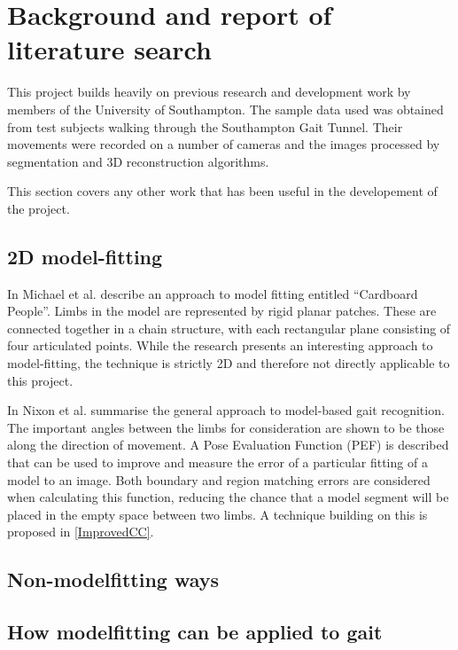 \section{Background and report of literature search}

This project builds heavily on previous research and development work by members of the University of Southampton.
The sample data used was obtained from test subjects walking through the Southampton Gait Tunnel.
Their movements were recorded on a number of cameras and the images processed by segmentation and 3D reconstruction algorithms.

This section covers any other work that has been useful in the developement of the project.

\subsection{2D model-fitting}

In \cite{cardboardpeople} Michael et al. describe an approach to model fitting entitled ``Cardboard People''.
Limbs in the model are represented by rigid planar patches.
These are connected together in a chain structure, with each rectangular plane consisting of four articulated points.
While the research presents an interesting approach to model-fitting, the technique is strictly 2D and therefore not directly applicable to this project.

In \cite{GaitBook} Nixon et al. summarise the general approach to model-based gait recognition.
The important angles between the limbs for consideration are shown to be those along the direction of movement.
A Pose Evaluation Function (PEF) is described that can be used to improve and measure the error of a particular fitting of a model to an image.
Both boundary and region matching errors are considered when calculating this function, reducing the chance that a model segment will be placed in the empty space between two limbs.
A technique building on this is proposed in \ref{ImprovedCC}.

\subsection{Non-modelfitting ways}

\subsection{How modelfitting can be applied to gait}

